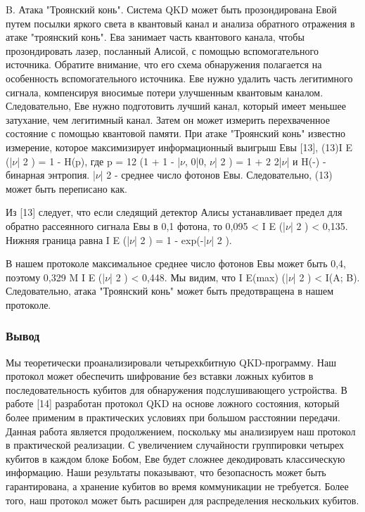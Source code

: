 B. Атака "Троянский конь". Система QKD может быть прозондирована Евой путем посылки яркого света в квантовый канал и анализа обратного отражения в атаке "троянский конь". Ева занимает часть квантового канала, чтобы прозондировать лазер, посланный Алисой, с помощью вспомогательного источника. Обратите внимание, что его схема обнаружения полагается на особенность вспомогательного источника. Еве нужно удалить часть легитимного сигнала, компенсируя вносимые потери улучшенным квантовым каналом. Следовательно, Еве нужно подготовить лучший канал, который имеет меньшее затухание, чем легитимный канал. Затем он может измерить перехваченное состояние с помощью квантовой памяти.
При атаке "Троянский конь" известно измерение, которое максимизирует информационный выигрыш Евы [13], (13)I E (|$\nu$| 2 ) = 1 - H(p), где p = 12 (1 + 1 - |$\nu$, 0|0, $\nu$| 2 ) = 1 + 2 2|$\nu$| и H(-) - бинарная энтропия. |$\nu$| 2 - среднее число фотонов Евы. Следовательно, (13) может быть переписано как.

Из [13] следует, что если следящий детектор Алисы устанавливает предел для обратно рассеянного сигнала Евы в 0,1 фотона, то 0,095 < I E (|$\nu$| 2 ) < 0,135. Нижняя граница равна I E (|$\nu$| 2 ) = 1 - exp(-|$\nu$| 2 ).

В нашем протоколе максимальное среднее число фотонов Евы может быть 0,4, поэтому 0,329 M I E (|$\nu$| 2 ) < 0,448. Мы видим, что I E(max) (|$\nu$| 2 ) < I(A; B). Следовательно, атака "Троянский конь" может быть предотвращена в нашем протоколе.

\subsubsection{Вывод}
Мы теоретически проанализировали четырехкбитную QKD-программу. Наш протокол может обеспечить шифрование без вставки ложных кубитов в последовательность кубитов для обнаружения подслушивающего устройства. В работе [14] разработан протокол QKD на основе ложного состояния, который более применим в практических условиях при большом расстоянии передачи. Данная работа является продолжением, поскольку мы анализируем наш протокол в практической реализации. С увеличением случайности группировки четырех кубитов в каждом блоке Бобом, Еве будет сложнее декодировать классическую информацию. Наши результаты показывают, что безопасность может быть гарантирована, а хранение кубитов во время коммуникации не требуется. Более того, наш протокол может быть расширен для распределения нескольких кубитов.


\subsection{\review}




